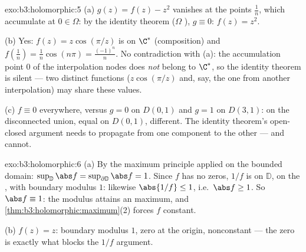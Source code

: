 \begin{solution}{exo:b3:holomorphic:5}
(a) $g(z) = f(z) - z^2$ vanishes at the points $\frac1n$,
which accumulate at $0 \in \Omega$: by the identity theorem
($\Omega$ ), $g \equiv 0$: $f(z) = z^2$.

(b) Yes: $f(z) = z\cos(\pi/z)$ is  on $\C^*$
(composition) and $f(\frac1n) = \frac1n\cos(n\pi) =
\frac{(-1)^n}n$. No contradiction with (a): the accumulation
point $0$ of the interpolation nodes does \emph{not} belong to
$\C^*$, so the identity theorem is silent --- two distinct
functions ($z\cos(\pi/z)$ and, say, the one from another
interpolation) may share these values.

(c) $f \equiv 0$ everywhere, versus $g = 0$ on $D(0,1)$ and
$g = 1$ on $D(3,1)$:  on the disconnected union,
equal on $D(0,1)$, different. The identity theorem's
open-closed argument needs  to propagate from one
component to the other --- and cannot.
\end{solution}

\begin{solution}{exo:b3:holomorphic:6}
(a) By the maximum principle applied on the bounded domain:
$\sup_{\mathbb D}\abs f = \sup_{\partial\mathbb D}\abs f = 1$.
Since $f$ has no zeros, $1/f$ is  on $\mathbb D$,
 on the , with boundary modulus $1$: likewise
$\abs{1/f} \leq 1$, i.e.\ $\abs f \geq 1$. So $\abs f \equiv
1$: the modulus attains an  maximum, and
\cref{thm:b3:holomorphic:maximum}(2) forces $f$ constant.

(b) $f(z) = z$: boundary modulus $1$, zero at the origin,
nonconstant --- the zero is exactly what blocks the $1/f$
argument.
\end{solution}

